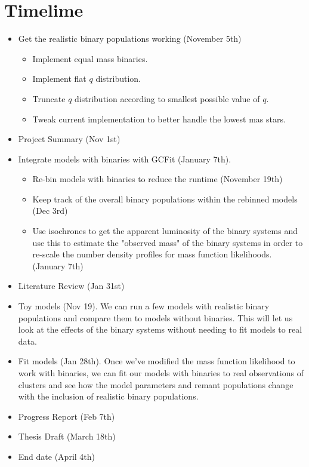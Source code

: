 \documentclass[12pt,letterpaper]{article}
\begin{document}
\section{Timelime}
\begin{itemize}
	\item Get the realistic binary populations working (November 5th)
	      \begin{itemize}
		      \item Implement equal mass binaries. \checkmark
		      \item Implement flat $q$ distribution. \checkmark
		      \item Truncate $q$ distribution according to smallest possible value of $q$.
		      \item Tweak current implementation to better handle the lowest mas stars.
	      \end{itemize}
	\item Project Summary (Nov 1st) \checkmark
	\item Integrate models with binaries with GCFit (January 7th).
	      \begin{itemize}
		      \item Re-bin models with binaries to reduce the runtime (November 19th)
		      \item Keep track of the overall binary populations within the rebinned models (Dec 3rd)
		      \item Use isochrones to get the apparent luminosity of the binary systems and
		            use this to estimate the "observed mass" of the binary systems in order
		            to re-scale the number density profiles for mass function likelihoods.
		            (January 7th)
	      \end{itemize}
	\item Literature Review (Jan 31st)
	\item Toy models (Nov 19). We can run a few models with realistic binary populations and
	      compare them to models without binaries. This will let us look at the effects of the
	      binary systems without needing to fit models to real data.
	\item Fit models (Jan 28th). Once we've modified the mass function likelihood to work with
	      binaries, we can fit our models with binaries to real observations of clusters and see
	      how the model parameters and remant populations change with the inclusion of realistic
	      binary populations.
	\item Progress Report (Feb 7th)
	\item Thesis Draft (March 18th)
	\item End date (April 4th)
\end{itemize}
\end{document}
